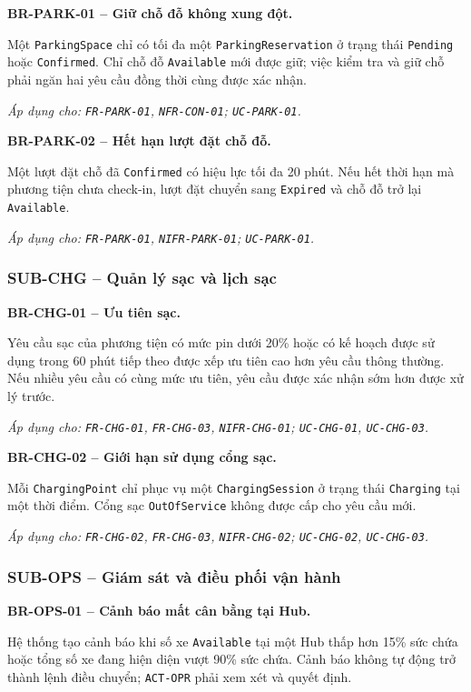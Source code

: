 \noindent\textbf{BR-PARK-01 -- Giữ chỗ đỗ không xung đột.}\par
\nopagebreak[4]
Một \texttt{ParkingSpace} chỉ có tối đa một \texttt{ParkingReservation} ở trạng thái \texttt{Pending} hoặc \texttt{Confirmed}. Chỉ chỗ đỗ \texttt{Available} mới được giữ; việc kiểm tra và giữ chỗ phải ngăn hai yêu cầu đồng thời cùng được xác nhận.

\textit{Áp dụng cho: \texttt{FR-PARK-01}, \texttt{NFR-CON-01}; \texttt{UC-PARK-01}.}

\medskip
\noindent\textbf{BR-PARK-02 -- Hết hạn lượt đặt chỗ đỗ.}\par
\nopagebreak[4]
Một lượt đặt chỗ đã \texttt{Confirmed} có hiệu lực tối đa 20 phút. Nếu hết thời hạn mà phương tiện chưa check-in, lượt đặt chuyển sang \texttt{Expired} và chỗ đỗ trở lại \texttt{Available}.

\textit{Áp dụng cho: \texttt{FR-PARK-01}, \texttt{NIFR-PARK-01}; \texttt{UC-PARK-01}.}

\subsubsection{SUB-CHG -- Quản lý sạc và lịch sạc}

\noindent\textbf{BR-CHG-01 -- Ưu tiên sạc.}\par
\nopagebreak[4]
Yêu cầu sạc của phương tiện có mức pin dưới 20\% hoặc có kế hoạch được sử dụng trong 60 phút tiếp theo được xếp ưu tiên cao hơn yêu cầu thông thường. Nếu nhiều yêu cầu có cùng mức ưu tiên, yêu cầu được xác nhận sớm hơn được xử lý trước.

\textit{Áp dụng cho: \texttt{FR-CHG-01}, \texttt{FR-CHG-03}, \texttt{NIFR-CHG-01}; \texttt{UC-CHG-01}, \texttt{UC-CHG-03}.}

\medskip
\noindent\textbf{BR-CHG-02 -- Giới hạn sử dụng cổng sạc.}\par
\nopagebreak[4]
Mỗi \texttt{ChargingPoint} chỉ phục vụ một \texttt{ChargingSession} ở trạng thái \texttt{Charging} tại một thời điểm. Cổng sạc \texttt{OutOfService} không được cấp cho yêu cầu mới.

\textit{Áp dụng cho: \texttt{FR-CHG-02}, \texttt{FR-CHG-03}, \texttt{NIFR-CHG-02}; \texttt{UC-CHG-02}, \texttt{UC-CHG-03}.}

\subsubsection{SUB-OPS -- Giám sát và điều phối vận hành}

\noindent\textbf{BR-OPS-01 -- Cảnh báo mất cân bằng tại Hub.}\par
\nopagebreak[4]
Hệ thống tạo cảnh báo khi số xe \texttt{Available} tại một Hub thấp hơn 15\% sức chứa hoặc tổng số xe đang hiện diện vượt 90\% sức chứa. Cảnh báo không tự động trở thành lệnh điều chuyển; \texttt{ACT-OPR} phải xem xét và quyết định.

